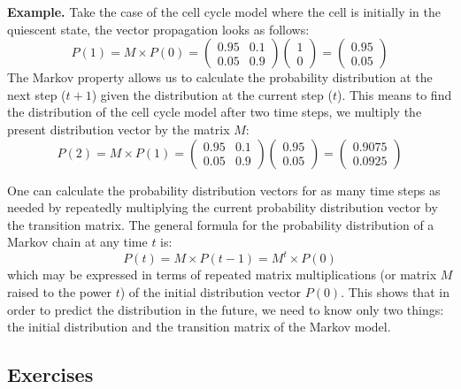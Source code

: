 \documentclass[
  letterpaper,
  DIV=11,
  numbers=noendperiod]{scrreprt}
\begin{document}
\textbf{Example.} Take the case of the cell cycle model where the cell
is initially in the quiescent state, the vector propagation looks as
follows:
\[ P(1) = M \times  P(0) = \left(\begin{array}{cc}0.95 & 0.1 \\0.05 & 0.9\end{array}\right)  \left(\begin{array}{c}1  \\ 0\end{array}\right) = \left(\begin{array}{c} 0.95 \\ 0.05\end{array}\right) \]
The Markov property allows us to calculate the probability distribution
at the next step (\(t+1\)) given the distribution at the current step
(\(t\)). This means to find the distribution of the cell cycle model
after two time steps, we multiply the present distribution vector by the
matrix \(M\):
\[ P(2) = M   \times  P(1) =  \left(\begin{array}{cc}0.95 & 0.1 \\0.05 & 0.9\end{array}\right)\left(\begin{array}{c} 0.95 \\ 0.05\end{array}\right) = \left(\begin{array}{c} 0.9075 \\ 0.0925\end{array}\right) \]

One can calculate the probability distribution vectors for as many time
steps as needed by repeatedly multiplying the current probability
distribution vector by the transition matrix. The general formula for
the probability distribution of a Markov chain at any time \(t\) is: \[
P(t) = M \times P(t-1) = M^{t}  \times  P(0)
\label{eq:Markov_chain}
\] which may be expressed in terms of repeated matrix multiplications
(or matrix \(M\) raised to the power \(t\)) of the initial distribution
vector \(P(0)\). This shows that in order to predict the distribution in
the future, we need to know only two things: the initial distribution
and the transition matrix of the Markov model.

\hypertarget{exercises-34}{%
\subsection{Exercises}\label{exercises-34}}
\end{document}
